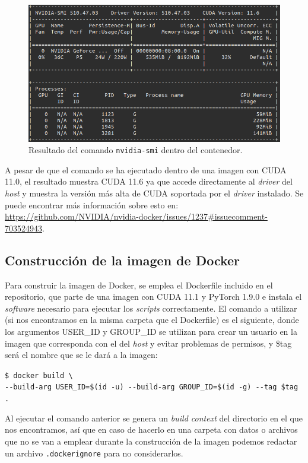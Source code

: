 \begin{figure}[H]
\centering
\includegraphics[width=1\linewidth]{imagenes/nvidia-smi.png} 
\captionsetup{width=1\linewidth}
\caption{Resultado del comando \texttt{nvidia-smi} dentro del contenedor.}
\label{fig:performer}
\end{figure}

A pesar de que el comando se ha ejecutado dentro de una imagen con CUDA 11.0, el resultado muestra CUDA 11.6 ya que accede directamente al \textit{driver} del \textit{host} y muestra la versión más alta de CUDA soportada por el \textit{driver} instalado. Se puede encontrar más información sobre esto en: \url{https://github.com/NVIDIA/nvidia-docker/issues/1237#issuecomment-703524943}.

\subsection{Construcción de la imagen de Docker}

Para construir la imagen de Docker, se emplea el Dockerfile incluido en el repositorio, que parte de una imagen con CUDA 11.1 y PyTorch 1.9.0 e instala el \textit{software} necesario para ejecutar los \textit{scripts} correctamente. El comando a utilizar (si nos encontramos en la misma carpeta que el Dockerfile) es el siguiente, donde los argumentos USER{\_}ID y GROUP{\_}ID se utilizan para crear un usuario en la imagen que corresponda con el del \textit{host} y evitar problemas de permisos, y \$tag será el nombre que se le dará a la imagen:

\texttt{\$ docker build \textbackslash \\
{-}{-}build{-}arg USER{\_}ID=\$(id {-}u) {-}{-}build{-}arg GROUP{\_}ID=\$(id {-}g) {-}{-}tag \$tag .}

Al ejecutar el comando anterior se genera un \textit{build context} del directorio en el que nos encontramos, así que en caso de hacerlo en una carpeta con datos o archivos que no se van a emplear durante la construcción de la imagen podemos redactar un archivo \texttt{.dockerignore} para no considerarlos.

